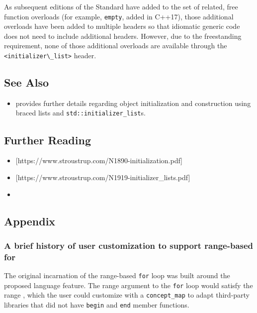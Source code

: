 As subsequent editions of the Standard have added to the set of related,
free function overloads (for example, \lstinline!empty!, added in C++17),
those additional overloads have been added to multiple headers so that
idiomatic generic code does not need to include additional headers.
However, due to the freestanding requirement, none of those additional
overloads are available through the \lstinline!<initializer\_list>! header.

\subsection[See Also]{See Also}\label{see-also}

\begin{itemize}
\item{provides further details regarding object initialization and construction using braced lists and \lstinline!std::initializer_list!s.}
\end{itemize}

\subsection[Further Reading]{Further Reading}\label{further-reading}

\begin{itemize}
\item{\cite{stroustrup05a}[https://www.stroustrup.com/N1890-initialization.pdf]}
\item{\cite{stroustrup05a}[https://www.stroustrup.com/N1919-initializer\_lists.pdf]}
\item{\cite{krzemienski16}}
\end{itemize}
    

\subsection[Appendix]{Appendix}\label{appendix-initlist}

\subsubsection[A brief history of user customization to support range-based \lstinline!for!]{A brief history of user customization to support range-based {\SubsubsecCode for}}\label{a-brief-history-of-user-customization-to-support-range-based-for}

The original incarnation of the range-based \lstinline!for! loop was built
around the proposed  language feature. The range
argument to the \lstinline!for! loop would satisfy the range
, which the user could customize with a
\lstinline!concept_map! to adapt third-party libraries that did not have
\lstinline!begin! and \lstinline!end! member functions.

